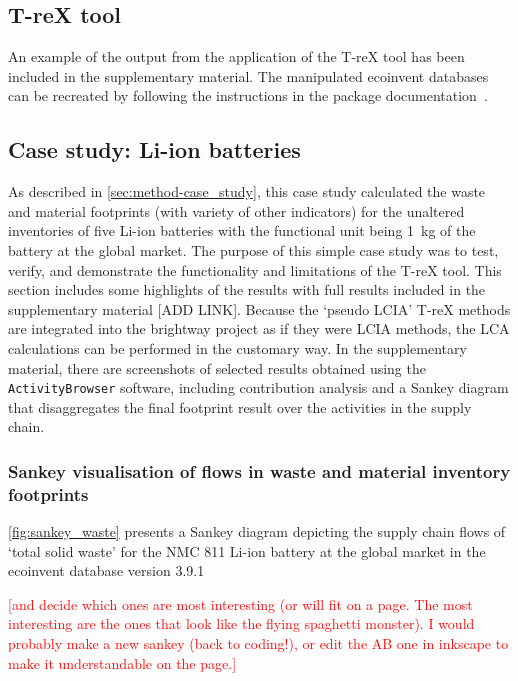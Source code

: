 \subsection{T-reX tool}\label{sec:results-T-reX}

An example of the output from the application of the T-reX tool has been included in the supplementary material. The manipulated ecoinvent databases can be recreated by following the instructions in the package documentation~\citep{mcdowall2023T-reXdocs}.

\subsection{Case study: Li-ion batteries}\label{sec:results-case_study}

As described in \autoref{sec:method-case_study}, this case study calculated the waste and material footprints (with variety of other indicators) for the unaltered inventories of five Li-ion batteries with the functional unit being 1~kg of the battery at the global market. The purpose of this simple case study was to test, verify, and demonstrate the functionality and limitations of the T-reX tool. This section includes some highlights of the results with full results included in the supplementary material [ADD LINK]. Because the `pseudo LCIA' T-reX methods are integrated into the brightway project as if they were LCIA methods, the LCA calculations can be performed in the customary way. In the supplementary material, there are screenshots of selected results obtained using the \texttt{ActivityBrowser} software, including contribution analysis and a Sankey diagram that disaggregates the final footprint result over the activities in the supply chain.

\subsubsection{Sankey visualisation of flows in waste and material inventory footprints}\label{sec:results-case_study-sankey}


\autoref{fig:sankey_waste} presents a Sankey diagram depicting the supply chain flows of `total solid waste' for the NMC 811 Li-ion battery at the global market in the ecoinvent database version 3.9.1


\textcolor{red}{[and decide which ones are most interesting (or will fit on a page. The most interesting are the ones that look like the flying spaghetti monster). I would probably make a new sankey (back to coding!), or edit the AB one in inkscape to make it understandable on the page.]}

